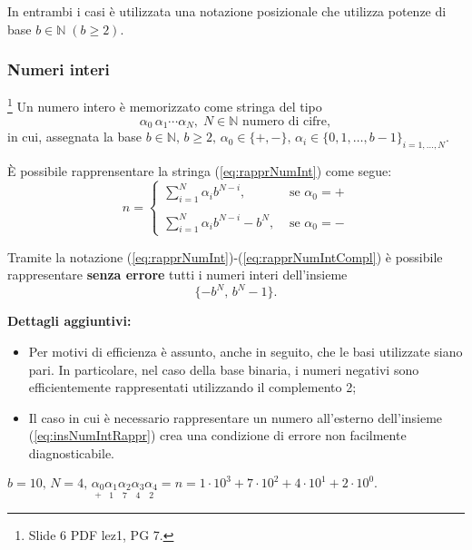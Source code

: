 In entrambi i casi è utilizzata una notazione posizionale che utilizza potenze di base $b\in\mathbb N\; (b\geq 2).$

\subsubsection{Numeri interi}\footnote{Slide 6 PDF lez1, PG 7.}
Un numero intero è memorizzato come stringa del tipo
\begin{equation}\label{eq:rapprNumInt}
    \alpha_0\,\alpha_1\cdots\alpha_N,\; N\in\mathbb N\text{ numero di cifre},
\end{equation}
in cui, assegnata la base $b\in\mathbb N,\, b\geq 2,\, \alpha_0\in\{+,-\},\, \alpha_i\in\{0,1,\hdots, b-1\}_{i=1,\hdots,N}.$

È possibile rapprensentare la stringa (\ref{eq:rapprNumInt}) come segue:
\begin{equation}\label{eq:rapprNumIntCompl}
    n=\begin{cases}
        \sum_{i=1}^N\alpha_i b^{N-i}, &\text{ se } \alpha_0=+\\
        \\
        \sum_{i=1}^N\alpha_i b^{N-i} -b^N, &\text{ se } \alpha_0=-
    \end{cases}
\end{equation}

Tramite la notazione (\ref{eq:rapprNumInt})-(\ref{eq:rapprNumIntCompl}) è possibile rappresentare \textbf{senza errore} tutti i numeri interi dell'insieme
\begin{equation}\label{eq:insNumIntRappr}
    \{-b^N,\,b^N-1\}.
\end{equation}

\textbf{Dettagli aggiuntivi:}
\begin{itemize}
    \item Per motivi di efficienza è assunto, anche in seguito, che le basi utilizzate siano pari. In particolare, nel caso della base binaria, i numeri negativi sono efficientemente rappresentati utilizzando il complemento 2;
    \item Il caso in cui è necessario rappresentare un numero all'esterno dell'insieme (\ref{eq:insNumIntRappr}) crea una condizione di errore non facilmente diagnosticabile. 
\end{itemize}

\begin{example}
    $b=10,\, N=4,\, \underset{+}{\alpha_0}\underset{1}{\alpha_1}\underset{7}{\alpha_2}\underset{4}{\alpha_3}\underset{2}{\alpha_4}=n=1\cdot 10^3+7\cdot 10^2+4\cdot 10^1+2\cdot 10^0.$
\end{example}

